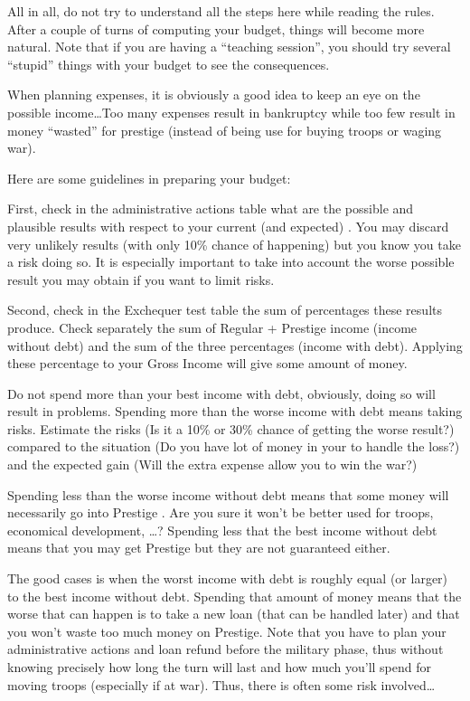 \begin{designnote}
  All in all, do not try to understand all the steps here while reading the
  rules. After a couple of turns of computing your budget, things will become
  more natural. Note that if you are having a ``teaching session'', you should
  try several ``stupid'' things with your budget to see the consequences.
\end{designnote}

\begin{playtip}
  When planning expenses, it is obviously a good idea to keep an eye on the
  possible income\ldots Too many expenses result in bankruptcy while too few
  result in money ``wasted'' for prestige (instead of being use for buying
  troops or waging war).

  Here are some guidelines in preparing your budget:
  
  First, check in the administrative actions table what are the possible and
  plausible results with respect to your current (and expected) \STAB. You may
  discard very unlikely results (with only 10\% chance of happening) but you
  know you take a risk doing so. It is especially important to take into
  account the worse possible result you may obtain if you want to limit risks.

  Second, check in the Exchequer test table the sum of percentages these
  results produce. Check separately the sum of Regular + Prestige income
  (income without debt) and the sum of the three percentages (income with
  debt). Applying these percentage to your Gross Income will give some amount
  of money.

  Do not spend more than your best income with debt, obviously, doing so
  will result in problems. Spending more than the worse income with debt means
  taking risks. Estimate the risks (Is it a 10\% or 30\% chance of getting the
  worse result?) compared to the situation (Do you have lot of money in your
  \RT to handle the loss?) and the expected gain (Will the extra expense allow
  you to win the war?)

  Spending less than the worse income without debt means that some money will
  necessarily go into Prestige \VPs. Are you sure it won't be better used for
  troops, economical development, \ldots? Spending less that the best income
  without debt means that you may get Prestige \VPs but they are not
  guaranteed either.

  The good cases is when the worst income with debt is roughly equal (or
  larger) to the best income without debt. Spending that amount of money means
  that the worse that can happen is to take a new loan (that can be handled
  later) and that you won't waste too much money on Prestige. Note that you
  have to plan your administrative actions and loan refund before the military
  phase, thus without knowing precisely how long the turn will last and how
  much you'll spend for moving troops (especially if at war). Thus, there is
  often some risk involved\ldots


\end{playtip}

